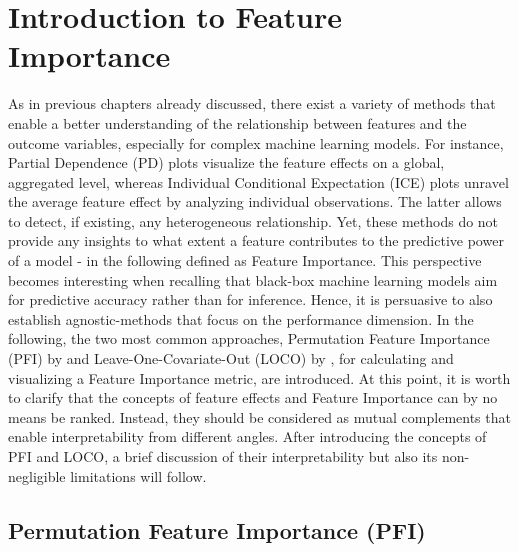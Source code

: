 \documentclass[
]{krantz}
\begin{document}
\hypertarget{introduction-to-feature-importance}{%
\chapter{Introduction to Feature Importance}\label{introduction-to-feature-importance}}

As in previous chapters already discussed, there exist a variety of methods that enable a better understanding of the relationship between features and the outcome variables, especially for complex machine learning models. For instance, Partial Dependence (PD) plots visualize the feature effects on a global, aggregated level, whereas Individual Conditional Expectation (ICE) plots unravel the average feature effect by analyzing individual observations. The latter allows to detect, if existing, any heterogeneous relationship. Yet, these methods do not provide any insights to what extent a feature contributes to the predictive power of a model - in the following defined as Feature Importance. This perspective becomes interesting when recalling that black-box machine learning models aim for predictive accuracy rather than for inference. Hence, it is persuasive to also establish agnostic-methods that focus on the performance dimension. In the following, the two most common approaches, Permutation Feature Importance (PFI) by \citet{breiman2001random} and Leave-One-Covariate-Out (LOCO) by \citet{lei2018distribution}, for calculating and visualizing a Feature Importance metric, are introduced. At this point, it is worth to clarify that the concepts of feature effects and Feature Importance can by no means be ranked. Instead, they should be considered as mutual complements that enable interpretability from different angles. After introducing the concepts of PFI and LOCO, a brief discussion of their interpretability but also its non-negligible limitations will follow.

\hypertarget{permutation-feature-importance-pfi}{%
\section{Permutation Feature Importance (PFI)}\label{permutation-feature-importance-pfi}}
\end{document}
